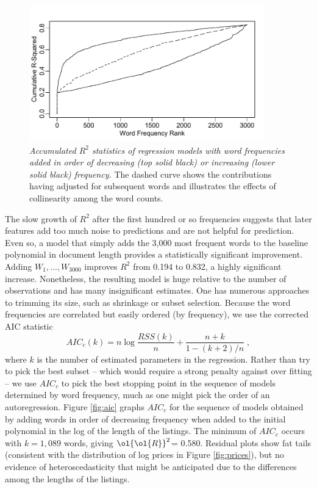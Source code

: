\documentclass[12pt]{article}
\newcommand{\prs}{\mbox{$\ol{\ol{R}}^2$}}
\begin{document}
\begin{figure}
\caption{ \label{fig:cumr2} 
{\sl Accumulated $R^2$ statistics of regression models with word frequencies
 added in order of decreasing (top solid black) or increasing (lower solid
 black) frequency.} The dashed curve shows the contributions having adjusted for
 subsequent words and illustrates the effects of collinearity among the word
 counts.}  
 \centerline{ \includegraphics[width=4in]{figures/cumr2.pdf} }
\end{figure}


 The slow growth of $R^2$ after the first hundred or so frequencies suggests
 that later features add too much noise to predictions and are not helpful for
 prediction.  Even so, a model that simply adds the 3,000 most frequent words to
 the baseline polynomial in document length provides a statistically significant 
 improvement. Adding
 $W_1,\ldots,W_{3000}$ improves $R^2$ from 0.194 to 0.832, a highly significant
 increase.  Nonetheless, the resulting model is huge relative to the number of
 observations and has many insignificant estimates.  One has numerous approaches
 to trimming its size, such as shrinkage or subset selection.  Because the word
 frequencies are correlated but easily ordered (by frequency), we use the
 corrected AIC statistic \citep{hurvich89}
 \begin{equation}
    AIC_{c}(k) = n \log \frac{RSS(k)}{n} + \frac{n+k}{1-(k+2)/n} \;,
 \end{equation}
 where $k$ is the number of estimated parameters in the regression.  Rather than
 try to pick the best subset -- which would require a strong penalty against
 over fitting -- we use $AIC_c$ to pick the best stopping point in the 
 sequence of models determined by word frequency, much as one might pick the
 order of an autoregression.  Figure \ref{fig:aic} graphs $AIC_c$ for the
 sequence of models obtained by adding words in order of decreasing frequency
 when added to the initial polynomial in the log of the length of the listings.
  The minimum of $AIC_c$ occurs with $k=1,089$ words, giving \prs = 0.580.
  Residual plots show fat tails (consistent with the distribution of log prices
 in Figure \ref{fig:prices}), but no evidence of heteroscedasticity that might
 be anticipated due to the differences among the lengths of the listings.
\end{document}
